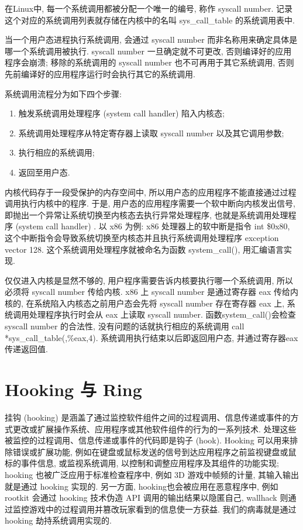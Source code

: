 \documentclass[11pt,fleqn]{book} %
\begin{document}
在Linux中, 每一个系统调用都被分配一个唯一的编号, 称作 syscall number. 记录这个对应的系统调用列表就存储在内核中的名叫
sys\_call\_table 的系统调用表中. 

当一个用户态进程执行系统调用, 会通过 syscall number 而非名称用来确定具体是哪一个系统调用被执行. syscall
number 一旦确定就不可更改, 否则编译好的应用程序会崩溃; 移除的系统调用的 syscall number 也不可再用于其它系统调用,
否则先前编译好的应用程序运行时会执行其它的系统调用.

系统调用流程分为如下四个步骤:
\begin{enumerate}
\item 触发系统调用处理程序 (system call handler) 陷入内核态;
\item 系统调用处理程序从特定寄存器上读取 syscall number 以及其它调用参数;
\item 执行相应的系统调用;
\item 返回至用户态.
\end{enumerate}


内核代码存于一段受保护的内存空间中, 所以用户态的应用程序不能直接通过过程调用执行内核中的程序. 于是, 用户态的应用程序需要一个软中断向内核发出信号,
即抛出一个异常让系统切换至内核态去执行异常处理程序, 也就是系统调用处理程序 (system call handler) . 以 x86
为例: x86 处理器上的软中断是指令 int \$0x80, 这个中断指令会导致系统切换至内核态并且执行系统调用处理程序 exception
vector 128. 这个系统调用处理程序就被命名为函数 system\_call(), 用汇编语言实现.

仅仅进入内核是显然不够的, 用户程序需要告诉内核要执行哪一个系统调用, 所以必须将 syscall number 传给内核. x86
上 syscall number 是通过寄存器 eax 传给内核的, 在系统陷入内核态之前用户态会先将 syscall number
存在寄存器 eax 上, 系统调用处理程序执行时会从 eax 上读取 syscall number. 函数system\_call()会检查
syscall number 的合法性, 没有问题的话就执行相应的系统调用 call {*}sys\_call\_table(,\%eax,4).
系统调用执行结束以后即返回用户态, 并通过寄存器eax传递返回值. 


\section{Hooking 与 Ring}



挂钩 (hooking) 是涵盖了通过监控软件组件之间的过程调用、信息传递或事件的方式更改或扩展操作系统、应用程序或其他软件组件的行为的一系列技术.
处理这些被监控的过程调用、信息传递或事件的代码即是钩子 (hook). Hooking 可以用来排除错误或扩展功能, 例如在键盘或鼠标发送的信号到达应用程序之前监视键盘或鼠标的事件信息,
或监视系统调用, 以控制和调整应用程序及其组件的功能实现; hooking 也被广泛应用于标准检查程序中, 例如 3D 游戏中帧频的计量,
其输入输出就是通过 hooking 实现的. 另一方面, hooking也会被应用在恶意程序中, 例如 rootkit 会通过 hooking
技术伪造 API 调用的输出结果以隐匿自己, wallhack 则通过监控游戏中的过程调用并篡改玩家看到的信息使一方获益. 我们的病毒就是通过
hooking 劫持系统调用实现的. 
\end{document}
